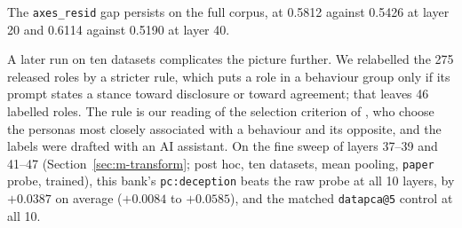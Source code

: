 The \texttt{axes\_resid} gap persists on the full corpus, at 0.5812 against 0.5426 at layer 20 and 0.6114 against 0.5190 at layer 40. %

A later run on ten datasets complicates the picture further. %
We relabelled the 275 released roles by a stricter rule, which puts a role in a behaviour group only if its prompt states a stance toward disclosure or toward agreement; that leaves 46 labelled roles. %
The rule is our reading of the selection criterion of \textcite[p.~3]{mahadik2026persona}, who choose the personas most closely associated with a behaviour and its opposite, and the labels were drafted with an AI assistant. %
On the fine sweep of layers 37--39 and 41--47 (Section~\ref{sec:m-transform}; post hoc, ten datasets, mean pooling, \texttt{paper} probe, trained), this bank's \texttt{pc:deception} beats the raw probe at all 10 layers, by $+0.0387$ on average ($+0.0084$ to $+0.0585$), and the matched \texttt{datapca@5} control at all 10. %
